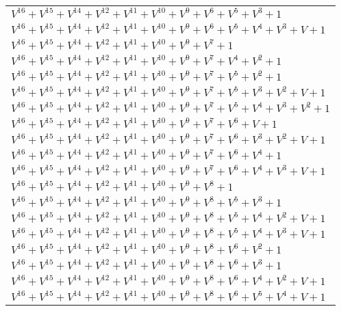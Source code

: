 \documentclass[12pt]{article}
\begin{document}
\begin{adjustwidth}{-4cm}{}
\begin{center}
\begin{longtable}{|l|}
$V^{16}  +V^{15}  +V^{14}  +V^{12}  +V^{11}  +V^{10}  +V^{9}  +V^{6}  +V^{5}  +V^{3}  + 1$ \\
$V^{16}  +V^{15}  +V^{14}  +V^{12}  +V^{11}  +V^{10}  +V^{9}  +V^{6}  +V^{5}  +V^{4}  +V^{3}  + V + 1$ \\
$V^{16}  +V^{15}  +V^{14}  +V^{12}  +V^{11}  +V^{10}  +V^{9}  +V^{7}  + 1$ \\
$V^{16}  +V^{15}  +V^{14}  +V^{12}  +V^{11}  +V^{10}  +V^{9}  +V^{7}  +V^{4}  +V^{2}  + 1$ \\
$V^{16}  +V^{15}  +V^{14}  +V^{12}  +V^{11}  +V^{10}  +V^{9}  +V^{7}  +V^{5}  +V^{2}  + 1$ \\
$V^{16}  +V^{15}  +V^{14}  +V^{12}  +V^{11}  +V^{10}  +V^{9}  +V^{7}  +V^{5}  +V^{3}  +V^{2}  + V + 1$ \\
$V^{16}  +V^{15}  +V^{14}  +V^{12}  +V^{11}  +V^{10}  +V^{9}  +V^{7}  +V^{5}  +V^{4}  +V^{3}  +V^{2}  + 1$ \\
$V^{16}  +V^{15}  +V^{14}  +V^{12}  +V^{11}  +V^{10}  +V^{9}  +V^{7}  +V^{6}  + V + 1$ \\
$V^{16}  +V^{15}  +V^{14}  +V^{12}  +V^{11}  +V^{10}  +V^{9}  +V^{7}  +V^{6}  +V^{3}  +V^{2}  + V + 1$ \\
$V^{16}  +V^{15}  +V^{14}  +V^{12}  +V^{11}  +V^{10}  +V^{9}  +V^{7}  +V^{6}  +V^{4}  + 1$ \\
$V^{16}  +V^{15}  +V^{14}  +V^{12}  +V^{11}  +V^{10}  +V^{9}  +V^{7}  +V^{6}  +V^{4}  +V^{3}  + V + 1$ \\
$V^{16}  +V^{15}  +V^{14}  +V^{12}  +V^{11}  +V^{10}  +V^{9}  +V^{8}  + 1$ \\
$V^{16}  +V^{15}  +V^{14}  +V^{12}  +V^{11}  +V^{10}  +V^{9}  +V^{8}  +V^{5}  +V^{3}  + 1$ \\
$V^{16}  +V^{15}  +V^{14}  +V^{12}  +V^{11}  +V^{10}  +V^{9}  +V^{8}  +V^{5}  +V^{4}  +V^{2}  + V + 1$ \\
$V^{16}  +V^{15}  +V^{14}  +V^{12}  +V^{11}  +V^{10}  +V^{9}  +V^{8}  +V^{5}  +V^{4}  +V^{3}  + V + 1$ \\
$V^{16}  +V^{15}  +V^{14}  +V^{12}  +V^{11}  +V^{10}  +V^{9}  +V^{8}  +V^{6}  +V^{2}  + 1$ \\
$V^{16}  +V^{15}  +V^{14}  +V^{12}  +V^{11}  +V^{10}  +V^{9}  +V^{8}  +V^{6}  +V^{3}  + 1$ \\
$V^{16}  +V^{15}  +V^{14}  +V^{12}  +V^{11}  +V^{10}  +V^{9}  +V^{8}  +V^{6}  +V^{4}  +V^{2}  + V + 1$ \\
$V^{16}  +V^{15}  +V^{14}  +V^{12}  +V^{11}  +V^{10}  +V^{9}  +V^{8}  +V^{6}  +V^{5}  +V^{4}  + V + 1$ \\

\end{longtable}
\end{center}
\end{adjustwidth}
\end{document}
